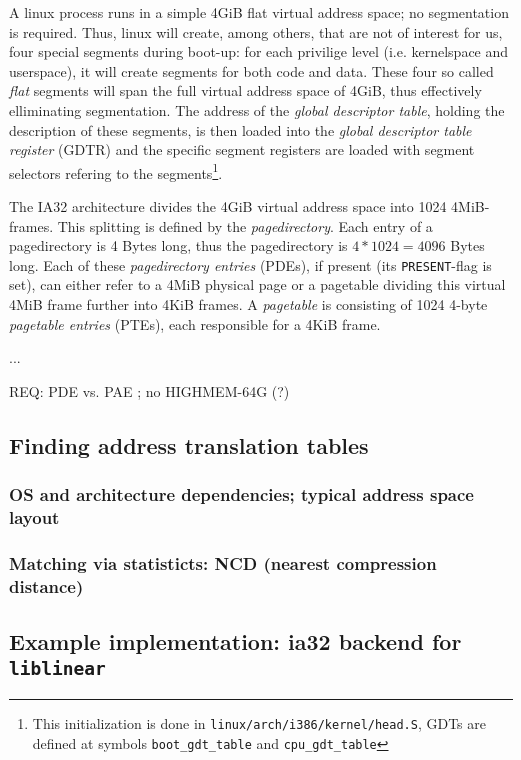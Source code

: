 A linux process runs in a simple 4GiB flat virtual address space; no
segmentation is required. Thus, linux will create, among others, that are not of
interest for us, four special segments during boot-up: for each privilige level
(i.e. kernelspace and userspace), it will create segments for both code and
data. These four so called \emph{flat} segments will span the full virtual
address space of 4GiB, thus effectively elliminating segmentation. The address
of the \emph{global descriptor table}, holding the description of these
segments, is then loaded into the \emph{global descriptor table register} (GDTR)
and the specific segment registers are loaded with segment selectors refering to
the segments\footnote{This initialization is done in
\texttt{linux/arch/i386/kernel/head.S}, GDTs are defined at symbols
\texttt{boot\_gdt\_table} and \texttt{cpu\_gdt\_table}}.

The IA32 architecture divides the 4GiB virtual address space into 1024
4MiB-frames. This splitting is defined by the \emph{pagedirectory}. Each entry
of a pagedirectory is 4 Bytes long, thus the pagedirectory is $4*1024 = 4096$
Bytes long. Each of these \emph{pagedirectory entries} (PDEs), if present (its
\texttt{PRESENT}-flag is set), can either refer to a 4MiB physical page or a
pagetable dividing this virtual 4MiB frame further into 4KiB frames. A
\emph{pagetable} is consisting of 1024 4-byte \emph{pagetable entries} (PTEs),
each responsible for a 4KiB frame.

...

REQ: PDE vs. PAE ; no HIGHMEM-64G (?)

\subsection{Finding address translation tables}
\label{findingATT}

\subsubsection{OS and architecture dependencies; typical address space layout}

\subsubsection{Matching via statisticts: NCD (nearest compression distance)}



\subsection{Example implementation: ia32 backend for \texttt{liblinear}}



